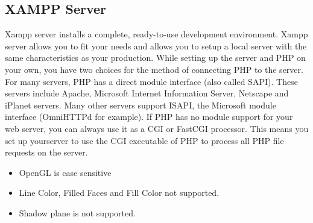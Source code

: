 \subsection{XAMPP Server}
Xampp server installs a complete, ready-to-use development environment. Xampp server allows
you to fit your needs and allows you to setup a local server with the same characteristics as your
production.
While setting up the server and PHP on your own, you have two choices for the method of connecting PHP to the server. For many servers, PHP has a direct module interface (also called SAPI).
These servers include Apache, Microsoft Internet Information Server, Netscape and iPlanet servers.
Many other servers support ISAPI, the Microsoft module interface (OmniHTTPd for example). If
PHP has no module support for your web server, you can always use it as a CGI or FastCGI processor.
This means you set up yourserver to use the CGI executable of PHP to process all PHP file requests
on the server.
\begin{itemize}
\item{OpenGL is case sensitive}
\item{Line Color, Filled Faces and Fill Color not supported.}
\item{Shadow plane is not supported.}
\end{itemize}



